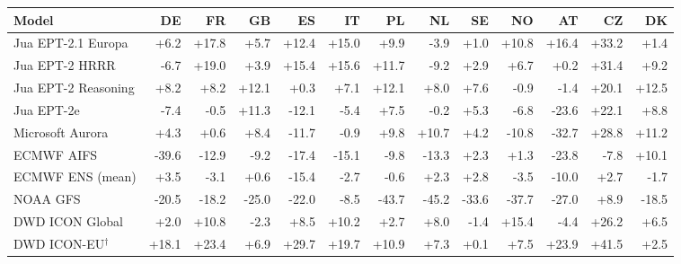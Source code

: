 \begin{tabular}{lrrrrrrrrrrrr}
\toprule
Model & DE & FR & GB & ES & IT & PL & NL & SE & NO & AT & CZ & DK \\
\midrule
Jua EPT-2.1 Europa & +6.2 & +17.8 & +5.7 & +12.4 & +15.0 & +9.9 & -3.9 & +1.0 & +10.8 & +16.4 & +33.2 & +1.4 \\
Jua EPT-2 HRRR & -6.7 & +19.0 & +3.9 & +15.4 & +15.6 & +11.7 & -9.2 & +2.9 & +6.7 & +0.2 & +31.4 & +9.2 \\
Jua EPT-2 Reasoning & +8.2 & +8.2 & +12.1 & +0.3 & +7.1 & +12.1 & +8.0 & +7.6 & -0.9 & -1.4 & +20.1 & +12.5 \\
Jua EPT-2e & -7.4 & -0.5 & +11.3 & -12.1 & -5.4 & +7.5 & -0.2 & +5.3 & -6.8 & -23.6 & +22.1 & +8.8 \\
Microsoft Aurora & +4.3 & +0.6 & +8.4 & -11.7 & -0.9 & +9.8 & +10.7 & +4.2 & -10.8 & -32.7 & +28.8 & +11.2 \\
ECMWF AIFS & -39.6 & -12.9 & -9.2 & -17.4 & -15.1 & -9.8 & -13.3 & +2.3 & +1.3 & -23.8 & -7.8 & +10.1 \\
ECMWF ENS (mean) & +3.5 & -3.1 & +0.6 & -15.4 & -2.7 & -0.6 & +2.3 & +2.8 & -3.5 & -10.0 & +2.7 & -1.7 \\
NOAA GFS & -20.5 & -18.2 & -25.0 & -22.0 & -8.5 & -43.7 & -45.2 & -33.6 & -37.7 & -27.0 & +8.9 & -18.5 \\
DWD ICON Global & +2.0 & +10.8 & -2.3 & +8.5 & +10.2 & +2.7 & +8.0 & -1.4 & +15.4 & -4.4 & +26.2 & +6.5 \\
DWD ICON-EU$^{\dagger}$ & +18.1 & +23.4 & +6.9 & +29.7 & +19.7 & +10.9 & +7.3 & +0.1 & +7.5 & +23.9 & +41.5 & +2.5 \\
\bottomrule
\end{tabular}
